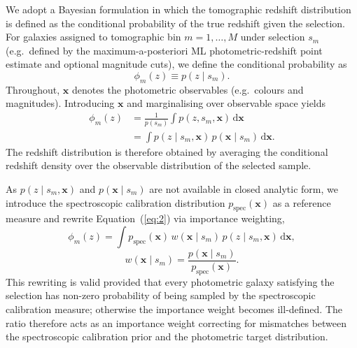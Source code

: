 We adopt a Bayesian formulation in which the tomographic redshift distribution is defined as the conditional probability of the true redshift given the selection. For galaxies assigned to tomographic bin \(m = 1, \ldots, M\) under selection \(s_m\) (e.g.\ defined by the maximum-a-posteriori ML photometric-redshift point estimate and optional magnitude cuts), we define the conditional probability as
\begin{equation} \label{eq:1}
    \phi_m(z) \equiv p(z \mid s_m).
\end{equation}
Throughout, \(\mathbf{x}\) denotes the photometric observables (e.g.\ colours and magnitudes). Introducing \(\mathbf{x}\) and marginalising over observable space yields
\begin{equation} \label{eq:2}
\begin{split}
    \phi_m(z) &= \frac{1}{p(s_m)} \int p(z, s_m, \mathbf{x}) \, \mathrm{d}\mathbf{x} \\
    &= \int p(z \mid s_m, \mathbf{x}) \, p(\mathbf{x} \mid s_m) \, \mathrm{d}\mathbf{x}.
\end{split}
\end{equation}
The redshift distribution is therefore obtained by averaging the conditional redshift density over the observable distribution of the selected sample.

As \(p(z \mid s_m, \mathbf{x})\) and \(p(\mathbf{x} \mid s_m)\) are not available in closed analytic form, we introduce the spectroscopic calibration distribution \(p_\mathrm{spec}(\mathbf{x})\) as a reference measure and rewrite Equation~(\ref{eq:2}) via importance weighting,
\begin{equation} \label{eq:3}
    \phi_m(z) = \int p_\mathrm{spec}(\mathbf{x}) \, w(\mathbf{x} \mid s_m) \, p(z \mid s_m, \mathbf{x}) \, \mathrm{d}\mathbf{x},
\end{equation}
\begin{equation} \label{eq:4}
    w(\mathbf{x} \mid s_m) = \frac{p(\mathbf{x} \mid s_m)}{p_\mathrm{spec}(\mathbf{x})}.
\end{equation}
This rewriting is valid provided that every photometric galaxy satisfying the selection has non-zero probability of being sampled by the spectroscopic calibration measure; otherwise the importance weight becomes ill-defined. The ratio therefore acts as an importance weight correcting for mismatches between the spectroscopic calibration prior and the photometric target distribution.

